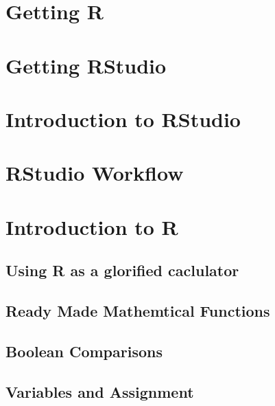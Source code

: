 \documentclass[
]{book}
\begin{document}
\hypertarget{getting-r}{%
\section{Getting R}\label{getting-r}}

\hypertarget{getting-rstudio}{%
\section{Getting RStudio}\label{getting-rstudio}}

\hypertarget{introduction-to-rstudio}{%
\section{Introduction to RStudio}\label{introduction-to-rstudio}}

\hypertarget{rstudio-workflow}{%
\section{RStudio Workflow}\label{rstudio-workflow}}

\hypertarget{introduction-to-r}{%
\section{Introduction to R}\label{introduction-to-r}}

\hypertarget{using-r-as-a-glorified-caclulator}{%
\subsection{Using R as a glorified caclulator}\label{using-r-as-a-glorified-caclulator}}

\hypertarget{ready-made-mathemtical-functions}{%
\subsection{Ready Made Mathemtical Functions}\label{ready-made-mathemtical-functions}}

\hypertarget{boolean-comparisons}{%
\subsection{Boolean Comparisons}\label{boolean-comparisons}}

\hypertarget{variables-and-assignment}{%
\subsection{Variables and Assignment}\label{variables-and-assignment}}
\end{document}
